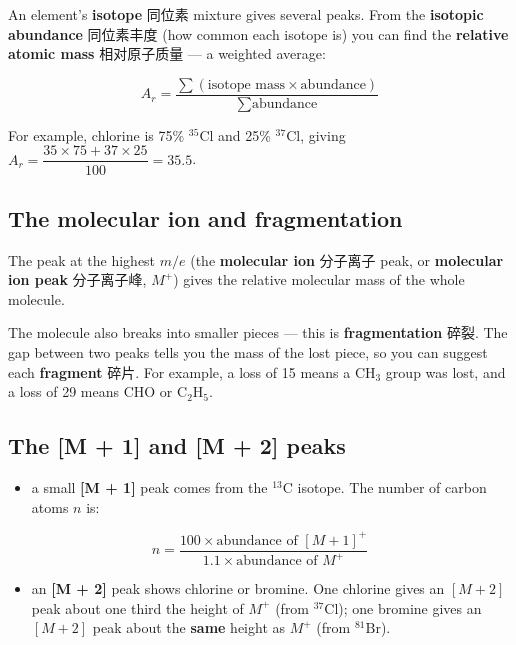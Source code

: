 \documentclass[11pt]{article}
\begin{document}
An element's \textbf{isotope} 同位素 mixture gives several peaks. From the \textbf{isotopic abundance} 同位素丰度 (how common each isotope is) you can find the \textbf{relative atomic mass} 相对原子质量 — a weighted average:

\[
A_r = \frac{\sum (\text{isotope mass} \times \text{abundance})}{\sum \text{abundance}}
\]

For example, chlorine is 75\% $^{35}\text{Cl}$ and 25\% $^{37}\text{Cl}$, giving $A_r = \dfrac{35 \times 75 + 37 \times 25}{100} = 35.5$.

\subsection*{The molecular ion and fragmentation}

The peak at the highest $m/e$ (the \textbf{molecular ion} 分子离子 peak, or \textbf{molecular ion peak} 分子离子峰, $M^+$) gives the relative molecular mass of the whole molecule.

The molecule also breaks into smaller pieces — this is \textbf{fragmentation} 碎裂. The gap between two peaks tells you the mass of the lost piece, so you can suggest each \textbf{fragment} 碎片. For example, a loss of 15 means a $\text{CH}_3$ group was lost, and a loss of 29 means $\text{CHO}$ or $\text{C}_2\text{H}_5$.

\subsection*{The [M + 1] and [M + 2] peaks}

\begin{itemize}
\item a small \textbf{[M + 1]} peak comes from the $^{13}\text{C}$ isotope. The number of carbon atoms $n$ is:

\end{itemize}

\[
n = \frac{100 \times \text{abundance of } [M + 1]^+}{1.1 \times \text{abundance of } M^+}
\]

\begin{itemize}
\item an \textbf{[M + 2]} peak shows chlorine or bromine. One chlorine gives an $[M + 2]$ peak about one third the height of $M^+$ (from $^{37}\text{Cl}$); one bromine gives an $[M + 2]$ peak about the \textbf{same} height as $M^+$ (from $^{81}\text{Br}$).

\end{itemize}
\end{document}
